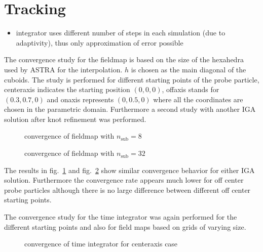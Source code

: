 \section{Tracking}
\begin{itemize}
  \item integrator uses different number of steps in each simulation (due to adaptivity), thus only approximation of error possible
\end{itemize}

The convergence study for the fieldmap is based on the size of the hexahedra used by ASTRA for the interpolation. $h$ is chosen as the main diagonal of the cuboids. The study is performed for different starting points of the probe particle, centeraxis indicates the starting position $(0, 0, 0)$, offaxis stands for $(0.3, 0.7, 0)$ and onaxis represents $(0, 0.5, 0)$ where all the coordinates are chosen in the parametric domain.
Furthermore a second study with another IGA solution after knot refinement was performed.

\begin{center}
\begin{figure}[H]
  
  \caption{convergence of fieldmap with $n_\mathrm{sub}=8$}
  \label{fig:grid_8}
\end{figure}
\end{center}

\begin{center}
\begin{figure}[H]
  
  \caption{convergence of fieldmap with $n_\mathrm{sub}=32$}
  \label{fig:grid_32}
\end{figure}
\end{center}

The results in fig.~\ref{fig:grid_8} and fig.~\ref{fig:grid_32} show similar convergence behavior for either IGA solution. Furthermore the convergence rate appears much lower for off center probe particles although there is no large difference between different off center starting points.

The convergence study for the time integrator was again performed for the different starting points and also for field maps based on grids of varying size.

\begin{center}
\begin{figure}[H]
  
  \caption{convergence of time integrator for centeraxis case}
  \label{fig:int_center}
\end{figure}
\end{center}


